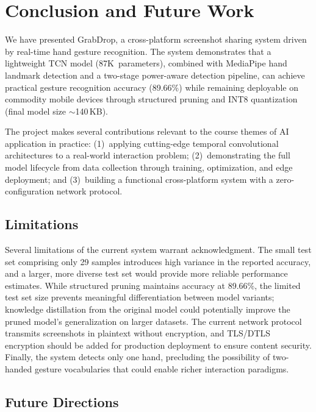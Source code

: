 \section{Conclusion and Future Work}
\label{sec:conclusion}

We have presented GrabDrop, a cross-platform screenshot sharing system
driven by real-time hand gesture recognition. The system demonstrates
that a lightweight TCN model (87K~parameters), combined with
MediaPipe hand landmark detection and a two-stage power-aware
detection pipeline, can achieve practical gesture recognition accuracy
(89.66\%) while remaining deployable on commodity mobile devices through
structured pruning and INT8 quantization (final model size
$\sim$140\,KB).

The project makes several contributions relevant to the course themes
of AI application in practice: (1)~applying cutting-edge temporal
convolutional architectures to a real-world interaction problem;
(2)~demonstrating the full model lifecycle from data collection through
training, optimization, and edge deployment; and (3)~building a
functional cross-platform system with a zero-configuration network
protocol.

\subsection{Limitations}

Several limitations of the current system warrant acknowledgment. The small test set comprising only 29 samples introduces high variance in the reported accuracy, and a larger, more diverse test set would provide more reliable performance estimates. While structured pruning maintains accuracy at 89.66\%, the limited test set size prevents meaningful differentiation between model variants; knowledge distillation from the original model could potentially improve the pruned model's generalization on larger datasets. The current network protocol transmits screenshots in plaintext without encryption, and TLS/DTLS encryption should be added for production deployment to ensure content security. Finally, the system detects only one hand, precluding the possibility of two-handed gesture vocabularies that could enable richer interaction paradigms.

\subsection{Future Directions}

